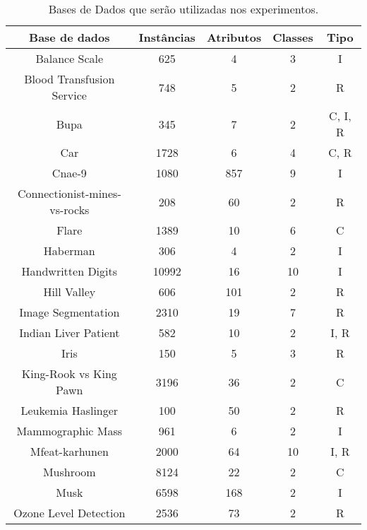     \begin{table}[h]
        \caption{Bases de Dados que serão utilizadas nos experimentos.}
        \centering
        \begin{tabular}{|c|c|c|c|c|} \hline
            \textbf{Base de dados} & \textbf{Instâncias} & \textbf{Atributos} & \textbf{Classes} & \textbf{Tipo} \\ \hline
            Balance Scale                &  625  &   4 &  3 & I \\ \hline
            Blood Transfusion Service    &  748  &   5 &  2 & R \\ \hline
            Bupa                         &  345  &   7 &  2 & C, I, R \\ \hline
            Car                          & 1728  &   6 &  4 & C, R \\ \hline
            Cnae-9                       & 1080  & 857 &  9 & I \\ \hline
            Connectionist-mines-vs-rocks &  208  &  60 &  2 & R \\ \hline
            Flare                        & 1389  &  10 &  6 & C \\ \hline
            Haberman                     &  306  &   4 &  2 & I \\ \hline
            Handwritten Digits           & 10992 &  16 & 10 & I \\ \hline
            Hill Valley                  &  606  & 101 &  2 & R \\ \hline
            Image Segmentation           & 2310  &  19 &  7 & R \\ \hline
            Indian Liver Patient         &  582  &  10 &  2 & I, R \\ \hline
            Iris                         &  150  &   5 &  3 & R \\ \hline
            King-Rook vs King Pawn       & 3196  &  36 &  2 & C \\ \hline
            Leukemia Haslinger           &  100  &  50 &  2 & R \\ \hline
            Mammographic Mass            &  961  &   6 &  2 & I \\ \hline
            Mfeat-karhunen               & 2000  &  64 & 10 & I, R \\ \hline
            Mushroom                     & 8124  &  22 &  2 & C \\ \hline
            Musk                         & 6598  & 168 &  2 & I \\ \hline
            Ozone Level Detection        & 2536  &  73 &  2 & R \\ \hline

\end{tabular}
\end{table}

